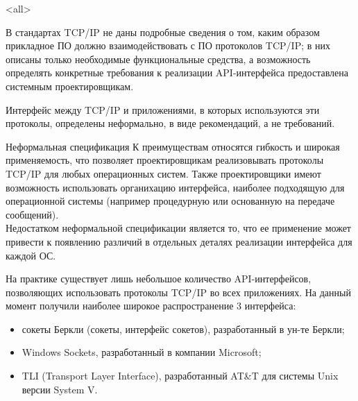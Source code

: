 

\subtitle{Программный интерфейс взаимодействия сокетов Беркли}



\mode<all>{}

%
%

\begin{frame}{}
В стандартах TCP/IP не даны подробные сведения о том,  каким образом прикладное ПО должно взаимодействовать с ПО протоколов TCP/IP; в них описаны только необходимые функциональные средства,  а возможность определять конкретные требования к реализации API-интерфейса предоставлена системным проектировщикам.

Интерфейс между TCP/IP и приложениями,  в которых используются эти протоколы,  определены неформально,  в виде рекомендаций,  а не требований.
\end{frame}

\begin{frame}{Неформальная спецификация}
К преимуществам относятся гибкость и широкая применяемость,  что позволяет проектировщикам реализовывать протоколы TCP/IP для любых операционных систем. Также проектировщики имеют возможность использовать органихацию интерфейса,  наиболее подходящую для операционной системы (например процедурную или основанную на передаче сообщений).\\
\pause
Недостатком неформальной спецификации является то,  что ее применение может привести к появлению различий в отдельных деталях реализации интерфейса для каждой ОС. 
\end{frame}

\begin{frame}{}
На практике существует лишь небольшое количество API-интерфейсов, позволяющих использовать протоколы TCP/IP во всех приложениях. На данный момент получили наиболее широкое распространение 3 интерфейса: 
\begin{itemize}
\item сокеты Беркли (сокеты,  интерфейс сокетов),  разработанный в ун-те Беркли; 
\item Windows Sockets, разработанный в компании Microsoft;
\item TLI (Transport Layer Interface), разработанный AT\&T для системы Unix версии System V.
\end{itemize}
\end{frame}

